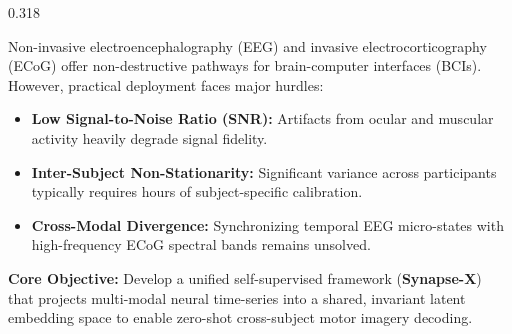 \documentclass[final]{beamer}
\begin{document}
\begin{frame}[t]
\vspace{12pt}

\begin{columns}[t]

  \begin{column}{0.318\textwidth}
    
    \begin{tcolorbox}[posterbox, title={\faInfoCircle{} 1. Introduction \& Motivation}]
      Non-invasive electroencephalography (EEG) and invasive electrocorticography (ECoG) offer non-destructive pathways for brain-computer interfaces (BCIs). However, practical deployment faces major hurdles:
      
      \begin{itemize}
        \item \textbf{Low Signal-to-Noise Ratio (SNR):} Artifacts from ocular and muscular activity heavily degrade signal fidelity.
        \item \textbf{Inter-Subject Non-Stationarity:} Significant variance across participants typically requires hours of subject-specific calibration.
        \item \textbf{Cross-Modal Divergence:} Synchronizing temporal EEG micro-states with high-frequency ECoG spectral bands remains unsolved.
      \end{itemize}
      
      \vspace{6pt}
      \tcblower
      \textbf{Core Objective:} Develop a unified self-supervised framework (\textbf{Synapse-X}) that projects multi-modal neural time-series into a shared, invariant latent embedding space to enable zero-shot cross-subject motor imagery decoding.
    \end{tcolorbox}
    
    \vspace{10pt}
    

\end{column}
\end{columns}
\end{frame}
\end{document}
